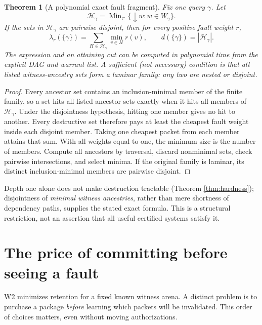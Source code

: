 \documentclass[11pt,letterpaper]{article}
\newtheorem{theorem}{Theorem}[section]
\DeclareMathOperator{\Min}{Min}
\newcommand{\calH}{\mathcal H}
\begin{document}
\begin{theorem}[A polynomial exact fault fragment]\label{thm:disjoint}
Fix one query $\gamma$. Let
\[
\calH_\gamma=\Min_{\subseteq}\{\downarrow w:w\in W_\gamma\}.
\]
If the sets in $\calH_\gamma$ are pairwise disjoint, then for every positive fault weight $r$,
\[
\lambda_r(\{\gamma\})
=\sum_{H\in\calH_\gamma}\min_{v\in H}r(v),
\qquad
d(\{\gamma\})=|\calH_\gamma|.
\tag{8}\label{eq:disjoint}
\]
The expression and an attaining cut can be computed in polynomial time from the explicit DAG and warrant list. A sufficient (not necessary) condition is that all listed witness-ancestry sets form a laminar family: any two are nested or disjoint.
\end{theorem}
\begin{proof}
Every ancestor set contains an inclusion-minimal member of the finite family, so a set hits all listed ancestor sets exactly when it hits all members of $\calH_\gamma$. Under the disjointness hypothesis, hitting one member gives no hit to another. Every destructive set therefore pays at least the cheapest fault weight inside each disjoint member. Taking one cheapest packet from each member attains that sum. With all weights equal to one, the minimum size is the number of members. Compute all ancestors by traversal, discard nonminimal sets, check pairwise intersections, and select minima. If the original family is laminar, its distinct inclusion-minimal members are pairwise disjoint.
\end{proof}

Depth one alone does not make destruction tractable (Theorem \ref{thm:hardness}); disjointness of \emph{minimal witness ancestries}, rather than mere shortness of dependency paths, supplies the stated exact formula. This is a structural restriction, not an assertion that all useful certified systems satisfy it.

\section{The price of committing before seeing a fault}\label{sec:commit}\label{gl-first-W3-s5}
W2 minimizes retention for a fixed known witness arena. A distinct problem is to purchase a package \emph{before} learning which packets will be invalidated. This order of choices matters, even without moving authorizations.
\end{document}
